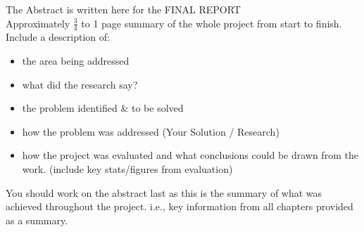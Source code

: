 The Abstract is written here for the FINAL REPORT\\
Approximately $\frac{3}{4}$ to 1 page summary of the whole project from start to finish.
Include a description of:
\begin{itemize}
    \item the area being addressed
    \item what did the research say?
    \item the problem identified \& to be solved
    \item how the problem was addressed (Your Solution / Research)
    \item how the project was evaluated and what conclusions could be drawn from the work. (include key stats/figures from evaluation)
\end{itemize}

You should work on the abstract last as this is the summary of what was achieved throughout the project. i.e., key information from all chapters provided as a summary.